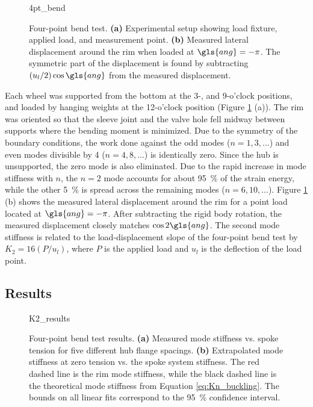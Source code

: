 \documentclass[\rootdir/thesis.tex]{subfiles}
\begin{document}
\begin{figure}[t]
\centering
{4pt_bend}
\caption{Four-point bend test. \textbf{(a)} Experimental setup showing load fixture, applied load, and measurement point. \textbf{(b)} Measured lateral displacement around the rim when loaded at $\gls{ang}=-\pi$. The symmetric part of the displacement is found by subtracting $(u_l/2)\cos{\gls{ang}}$ from the measured displacement.}
\label{fig:4pt_bend_setup}
\end{figure}

Each wheel was supported from the bottom at the 3-, and 9-o'clock positions, and loaded by hanging weights at the 12-o'clock position (Figure \ref{fig:4pt_bend_setup} (a)). The rim was oriented so that the sleeve joint and the valve hole fell midway between supports where the bending moment is minimized. Due to the symmetry of the boundary conditions, the work done against the odd modes ($n=1, 3, ...$) and even modes divisible by 4 ($n=4, 8, ...$) is identically zero. Since the hub is unsupported, the zero mode is also eliminated. Due to the rapid increase in mode stiffness with $n$, the $n=2$ mode accounts for about \SI{95}{\percent} of the strain energy, while the other \SI{5}{\percent} is spread across the remaining modes ($n=6, 10, ...$). Figure \ref{fig:4pt_bend_setup} (b) shows the measured lateral displacement around the rim for a point load located at $\gls{ang}=-\pi$. After subtracting the rigid body rotation, the measured displacement closely matches $\cos{2\gls{ang}}$. The second mode stiffness is related to the load-displacement slope of the four-point bend test by $K_2 = 16(P/u_l)$, where $P$ is the applied load and $u_l$ is the deflection of the load point.

\subsection{Results}
\label{sec:K2_T_results}

\begin{figure}[t]
\centering
{K2_results}
\caption{Four-point bend test results. \textbf{(a)} Measured mode stiffness vs. spoke tension for five different hub flange spacings. \textbf{(b)} Extrapolated mode stiffness at zero tension vs. the spoke system stiffness. The red dashed line is the rim mode stiffness, while the black dashed line is the theoretical mode stiffness from Equation \eqref{eq:Kn_buckling}. The bounds on all linear fits correspond to the \SI{95}{\percent} confidence interval.}
\label{fig:K2_results}
\end{figure}
\end{document}

